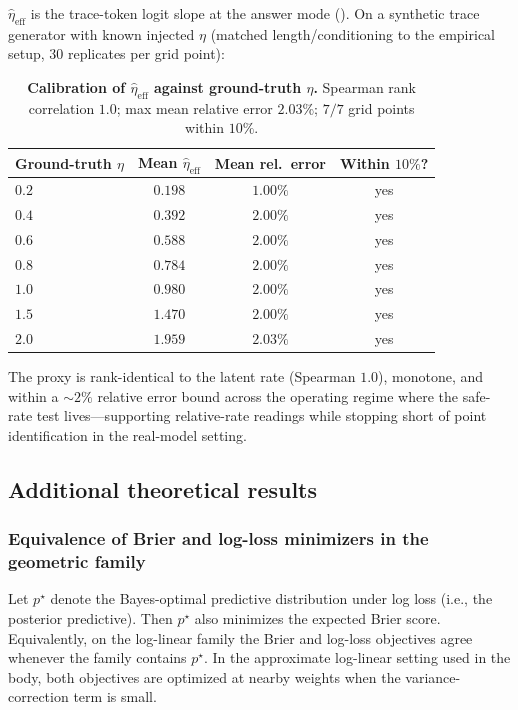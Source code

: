 $\hat\eta_{\mathrm{eff}}$ is the trace-token logit slope at the answer
mode ().  On a synthetic trace generator with known
injected $\eta$ (matched length/conditioning to the empirical setup,
$30$ replicates per grid point):

\begin{table}[H]
\centering\small
\caption{\textbf{Calibration of $\hat\eta_{\mathrm{eff}}$ against
ground-truth $\eta$.}  Spearman rank correlation $1.0$; max mean
relative error $2.03\%$; $7/7$ grid points within $10\%$.}
\label{tab:eta-proxy-id}
\begin{tabular}{lccc}
\toprule
\textbf{Ground-truth $\eta$} & \textbf{Mean $\hat\eta_{\mathrm{eff}}$} &
\textbf{Mean rel.\ error} & \textbf{Within $10\%$?}\\
\midrule
$0.2$ & $0.198$ & $1.00\%$ & yes\\
$0.4$ & $0.392$ & $2.00\%$ & yes\\
$0.6$ & $0.588$ & $2.00\%$ & yes\\
$0.8$ & $0.784$ & $2.00\%$ & yes\\
$1.0$ & $0.980$ & $2.00\%$ & yes\\
$1.5$ & $1.470$ & $2.00\%$ & yes\\
$2.0$ & $1.959$ & $2.03\%$ & yes\\
\bottomrule
\end{tabular}
\end{table}

The proxy is rank-identical to the latent rate (Spearman $1.0$),
monotone, and within a $\sim\!2\%$ relative error bound across the
operating regime where the safe-rate test lives—supporting
relative-rate readings while stopping short of point identification
in the real-model setting.

\subsection{Additional theoretical results}
\label{app:additional-theory}

\subsubsection{Equivalence of Brier and log-loss minimizers in the geometric family}

\begin{proposition}
\label{prop:brier-log-equivalence}
Let $p^\star$ denote the Bayes-optimal predictive distribution under log
loss (i.e., the posterior predictive).  Then $p^\star$ also minimizes the
expected Brier score.  Equivalently, on the log-linear family the
Brier and log-loss objectives agree whenever the family contains
$p^\star$.  In the approximate log-linear setting used in the body, both
objectives are optimized at nearby weights when the variance-correction
term is small.
\end{proposition}

